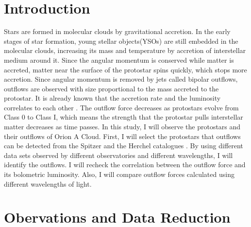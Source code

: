 \documentclass[twoside,11pt]{gshs_thesis}
\begin{document}
\cleardoublepage
\clearpage
\listoffigures	%

\cleardoublepage
\clearpage
\listoftables  %


\cleardoublepage
\clearpage
\renewcommand{\thepage}{\arabic{page}}
\setcounter{page}{1}



\section{Introduction}

Stars are formed in molecular clouds by gravitational accretion. In the early stages of star formation, young stellar objects(YSOs) are still embedded in the molecular clouds, increasing its mass and temperature by accretion of interstellar medium around it. Since the angular momentum is conserved while matter is accreted, matter near the surface of the protostar spins quickly, which stops more accretion. Since angular momentum is removed by jets called bipolar outflows, outflows are observed with size proportional to the mass accreted to the protostar\cite{Bontemps}. 
It is already known that the accretion rate and the luminosity correlates to each other \cite{Kang}. The outflow force decreases as protostars evolve from Class 0 to Class I, which means the strength that the protostar pulls interstellar matter decreases as time passes. 
In this study, I will observe the protostars and their outflows of Orion A Cloud. First, I will select the protostars that outflows can be detected from the Spitzer and the Herchel catalogues \cite{Spitzer, HerschelFurlan}. By using different data sets observed by different observatories and different wavelengths, I will identify the outflows. I will recheck the correlation between the outflow force and its bolometric luminosity. Also, I will compare outflow forces calculated using different wavelengths of light. 
\newpage
\section{Obervations and Data Reduction}
\end{document}
